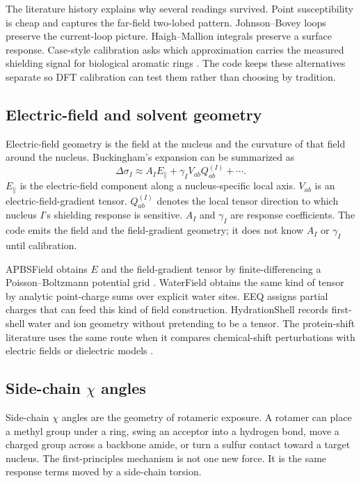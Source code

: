 \documentclass[11pt]{article}
\begin{document}
The literature history explains why several readings survived. Point
susceptibility is cheap and captures the far-field two-lobed pattern.
Johnson--Bovey loops preserve the current-loop picture. Haigh--Mallion
integrals preserve a surface response. Case-style calibration asks which
approximation carries the measured shielding signal for biological aromatic
rings \cite{case1995}. The code keeps these alternatives separate so DFT
calibration can test them rather than choosing by tradition.

\subsection{Electric-field and solvent geometry}

Electric-field geometry is the field at the nucleus and the curvature of that
field around the nucleus. Buckingham's expansion can be summarized as
\[
  \Delta\sigma_I
  \approx
  A_I E_\parallel
  +
  \gamma_I V_{ab}Q^{(I)}_{ab}
  +
  \cdots .
\]
\(E_\parallel\) is the electric-field component along a nucleus-specific local
axis. \(V_{ab}\) is an electric-field-gradient tensor. \(Q^{(I)}_{ab}\) denotes
the local tensor direction to which nucleus \(I\)'s shielding response is
sensitive. \(A_I\) and \(\gamma_I\) are response coefficients. The code emits
the field and the field-gradient geometry; it does not know \(A_I\) or
\(\gamma_I\) until calibration.

APBSField obtains \(E\) and the field-gradient tensor by finite-differencing a
Poisson--Boltzmann potential grid \cite{baker2001}. WaterField obtains the same
kind of tensor by analytic point-charge sums over explicit water sites. EEQ
assigns partial charges that can feed this kind of field construction.
HydrationShell records first-shell water and ion geometry without pretending to
be a tensor. The protein-shift literature uses the same route when it compares
chemical-shift perturbations with electric fields or dielectric models
\cite{hass2008,kukic2013,avbelj2004}.

\subsection{\texorpdfstring{Side-chain \(\chi\) angles}
{Side-chain chi angles}}

Side-chain \(\chi\) angles are the geometry of rotameric exposure. A rotamer can
place a methyl group under a ring, swing an acceptor into a hydrogen bond, move
a charged group across a backbone amide, or turn a sulfur contact toward a
target nucleus. The first-principles mechanism is not one new force. It is the
same response terms moved by a side-chain torsion.
\end{document}
